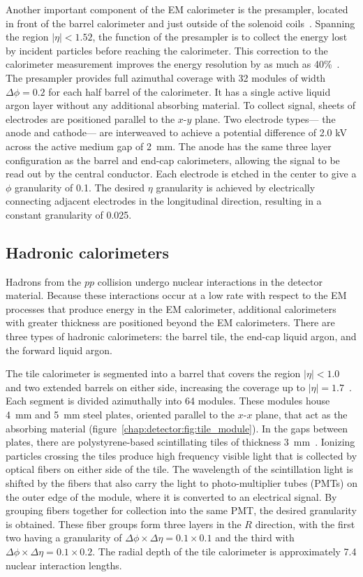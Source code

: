 Another important component of the EM calorimeter is the presampler,
located in front of the barrel calorimeter and just outside of the
solenoid coils~\cite{bib:Aad:2008zzm}. Spanning the region $|\eta| < 1.52$, the function of
the presampler is to collect the energy lost by incident particles
before reaching the calorimeter. This correction to the calorimeter
measurement improves the energy resolution by as much as
40\%~\cite{bib:Andrieux:2002xy}. The presampler provides full
azimuthal coverage with 32 modules of width $\Delta\phi = 0.2$ for
each half barrel of the calorimeter. It has a single active liquid
argon layer without any additional absorbing material. To collect
signal, sheets of electrodes are positioned parallel to the
$x$-$y$ plane. Two electrode types--- the anode and cathode--- are
interweaved to achieve a potential difference of 2.0 kV across the
active medium gap of 2~mm. The anode has the same three layer configuration as the
barrel and end-cap calorimeters, allowing the signal to be read out
by the central conductor. Each electrode is etched in the center to
give a $\phi$ granularity of 0.1. The desired $\eta$ granularity is
achieved by electrically connecting adjacent electrodes in the
longitudinal direction, resulting in a constant granularity of 0.025. 

\subsection{Hadronic calorimeters}

Hadrons from the $pp$ collision undergo nuclear interactions in the
detector material. Because these interactions occur at a low rate with
respect to the EM processes that produce energy in the EM calorimeter,
additional calorimeters with greater thickness are positioned beyond
the EM calorimeters. There are three types of hadronic calorimeters:
the barrel tile, the end-cap liquid argon, and the
forward liquid argon. 

The tile calorimeter is segmented into a barrel that covers the region
$|\eta| < 1.0$ and two extended barrels on either side, increasing the
coverage up to $|\eta| = 1.7$~\cite{bib:Abdallah:2008zz}. Each segment
is divided azimuthally into 64 modules. These modules house 4~mm and 5~mm
steel plates, oriented parallel to the $x$-$x$ plane, that act as the
absorbing material (figure~\ref{chap:detector:fig:tile_module}). In the gaps between plates, there are
polystyrene-based scintillating tiles of thickness
3~mm~\cite{bib:Aad:2008zzm}. Ionizing particles
crossing the tiles
produce high frequency visible light that is collected by optical fibers on
either side of the tile. The wavelength of the scintillation light is
shifted by the fibers that also carry the light to
photo-multiplier
tubes (PMTs) on the outer edge of the module, where it is converted to
an electrical signal. By grouping fibers together for
collection into the same PMT, the desired granularity is
obtained. These fiber groups form three layers in the $R$ direction,
with the first two having a granularity of $\Delta\phi
\times \Delta\eta = 0.1 \times 0.1$ and the third with $\Delta\phi
\times \Delta\eta = 0.1 \times 0.2$. The radial depth of the tile
calorimeter is approximately 7.4 nuclear interaction lengths. 

